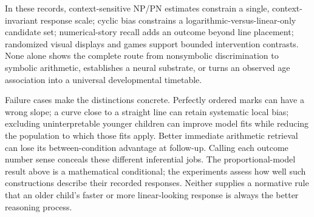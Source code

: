 In these records, context-sensitive NP/PN estimates constrain a
single, context-invariant response scale; cyclic bias constrains a
logarithmic-versus-linear-only candidate set; numerical-story recall
adds an outcome beyond line placement; randomized visual displays
and games support bounded intervention contrasts. None alone shows
the complete route from nonsymbolic discrimination to symbolic
arithmetic, establishes a neural substrate, or turns an observed age
association into a universal developmental timetable.

Failure cases make the distinctions concrete. Perfectly ordered
marks can have a wrong slope; a curve close to a straight line can
retain systematic local bias; excluding uninterpretable younger
children can improve model fits while reducing the population to
which those fits apply. Better immediate arithmetic retrieval can
lose its between-condition advantage at follow-up. Calling each
outcome number sense conceals these different inferential jobs.
The proportional-model result above is a mathematical conditional;
the experiments assess how well such constructions describe their
recorded responses. Neither supplies a normative rule that an older
child's faster or more linear-looking response is always the better
reasoning process.
